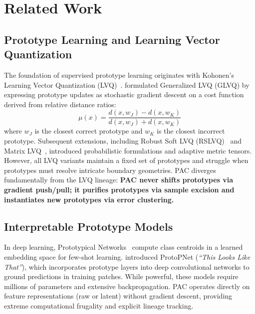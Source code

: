 \documentclass[11pt,a4paper]{article}
\begin{document}
\section{Related Work}
\label{sec:related}

\subsection{Prototype Learning and Learning Vector Quantization}
The foundation of supervised prototype learning originates with Kohonen's Learning Vector Quantization (LVQ)~\citep{kohonen1990self}. \citet{sato1996generalized} formulated Generalized LVQ (GLVQ) by expressing prototype updates as stochastic gradient descent on a cost function derived from relative distance ratios:
\begin{equation}
    \mu(x) = \frac{d(x, w_J) - d(x, w_K)}{d(x, w_J) + d(x, w_K)}
\end{equation}
where $w_J$ is the closest correct prototype and $w_K$ is the closest incorrect prototype. Subsequent extensions, including Robust Soft LVQ (RSLVQ)~\citep{seo2003soft} and Matrix LVQ~\citep{bunte2012limited}, introduced probabilistic formulations and adaptive metric tensors. However, all LVQ variants maintain a fixed set of prototypes and struggle when prototypes must resolve intricate boundary geometries. PAC diverges fundamentally from the LVQ lineage: \textbf{PAC never shifts prototypes via gradient push/pull; it purifies prototypes via sample excision and instantiates new prototypes via error clustering.}

\subsection{Interpretable Prototype Models}
In deep learning, Prototypical Networks~\citep{snell2017prototypical} compute class centroids in a learned embedding space for few-shot learning. \citet{chen2019looks} introduced ProtoPNet (\textit{``This Looks Like That''}), which incorporates prototype layers into deep convolutional networks to ground predictions in training patches. While powerful, these models require millions of parameters and extensive backpropagation. PAC operates directly on feature representations (raw or latent) without gradient descent, providing extreme computational frugality and explicit lineage tracking.
\end{document}
